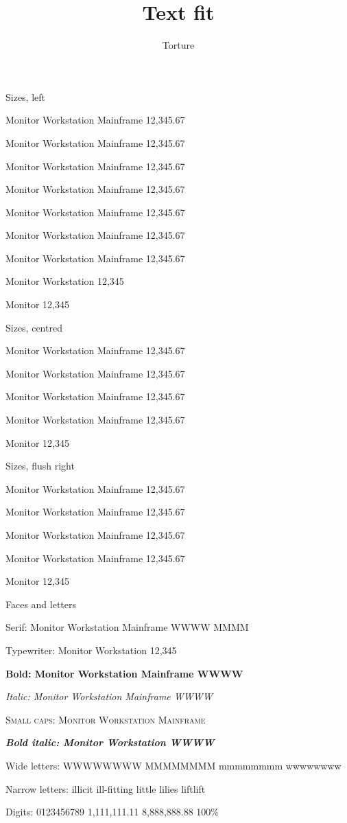 \documentclass{beamer}
\title{Text fit}
\author{Torture}
\newcommand{\probe}{Monitor Workstation Mainframe 12,345.67}
\begin{document}
\begin{frame}[label=sizes-left]{Sizes, left}
  {\tiny \probe\par}
  {\scriptsize \probe\par}
  {\footnotesize \probe\par}
  {\small \probe\par}
  {\normalsize \probe\par}
  {\large \probe\par}
  {\Large \probe\par}
  {\LARGE Monitor Workstation 12,345\par}
  {\huge Monitor 12,345\par}
\end{frame}

\begin{frame}[label=sizes-centred]{Sizes, centred}
  \begin{center}
    {\tiny \probe\par}
    {\footnotesize \probe\par}
    {\normalsize \probe\par}
    {\Large \probe\par}
    {\huge Monitor 12,345\par}
  \end{center}
\end{frame}

\begin{frame}[label=sizes-right]{Sizes, flush right}
  \begin{flushright}
    {\tiny \probe\par}
    {\footnotesize \probe\par}
    {\normalsize \probe\par}
    {\Large \probe\par}
    {\huge Monitor 12,345\par}
  \end{flushright}
\end{frame}

\begin{frame}[label=faces]{Faces and letters}
  {\rmfamily Serif: Monitor Workstation Mainframe WWWW MMMM\par}
  {\ttfamily Typewriter: Monitor Workstation 12,345\par}
  {\bfseries Bold: Monitor Workstation Mainframe WWWW\par}
  {\itshape Italic: Monitor Workstation Mainframe WWWW\par}
  {\scshape Small caps: Monitor Workstation Mainframe\par}
  {\bfseries\itshape Bold italic: Monitor Workstation WWWW\par}
  Wide letters: WWWWWWWW MMMMMMMM mmmmmmmm wwwwwwww\par
  Narrow letters: illicit ill-fitting little lilies liftlift\par
  Digits: 0123456789 1,111,111.11 8,888,888.88 100\%\par
\end{frame}
\end{document}
